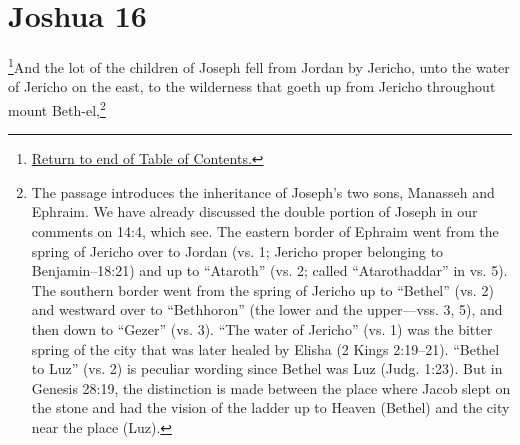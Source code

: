 \chapter{Joshua 16}
\footnote{\textcolor[rgb]{0.00,0.25,0.00}{\hyperlink{TOC}{Return to end of Table of Contents.}}}\textcolor[rgb]{0.00,0.00,1.00}{And the lot of the children of Joseph fell from Jordan by Jericho, unto the water of Jericho on the east, to the wilderness that goeth up from Jericho throughout mount Beth-el,}\footnote{The passage introduces the inheritance of
Joseph’s two sons, Manasseh and Ephraim. We
have already discussed the double portion of
Joseph in our comments on 14:4, which see.
The eastern border of Ephraim went from
the spring of Jericho over to Jordan (vs. 1; Jericho proper belonging to Benjamin--18:21) and up to “Ataroth” (vs. 2; called
“Atarothaddar” in vs. 5). The southern border went from the spring of Jericho up to “Bethel”
(vs. 2) and westward over to “Bethhoron” (the lower and the upper—vss. 3, 5), and then down
to “Gezer” (vs. 3).
“The water of Jericho” (vs. 1) was the
bitter spring of the city that was later healed by
Elisha (2 Kings 2:19–21). “Bethel to Luz” (vs.
2) is peculiar wording since Bethel was Luz
(Judg. 1:23). But in Genesis 28:19, the
distinction is made between the place where
Jacob slept on the stone and had the vision of
the ladder up to Heaven (Bethel) and the city
near the place (Luz).}
